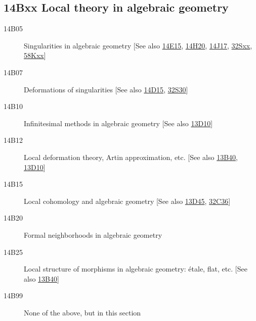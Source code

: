 \subsection*{14Bxx Local theory in algebraic geometry }\label{14Bxx}
\begin{description}               
\item [14B05]\label{14B05} Singularities in algebraic geometry [See also \hyperref[14E15]{14E15}, \hyperref[14H20]{14H20}, \hyperref[14J17]{14J17}, \hyperref[32Sxx]{32Sxx}, \hyperref[58Kxx]{58Kxx}]
\item [14B07]\label{14B07} Deformations of singularities [See also \hyperref[14D15]{14D15}, \hyperref[32S30]{32S30}]
\item [14B10]\label{14B10} Infinitesimal methods in algebraic geometry [See also \hyperref[13D10]{13D10}]
\item [14B12]\label{14B12} Local deformation theory, Artin approximation, etc. [See also \hyperref[13B40]{13B40}, \hyperref[13D10]{13D10}]
\item [14B15]\label{14B15} Local cohomology and algebraic geometry [See also \hyperref[13D45]{13D45}, \hyperref[32C36]{32C36}]
\item [14B20]\label{14B20} Formal neighborhoods in algebraic geometry
\item [14B25]\label{14B25} Local structure of morphisms in algebraic geometry: \'{e}tale, flat, etc. [See also \hyperref[13B40]{13B40}]
\item [14B99]\label{14B99} None of the above, but in this section
\end{description}          

